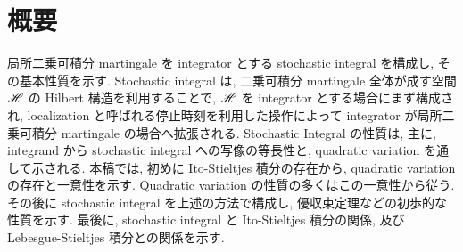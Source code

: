 \documentclass{ltjsarticle}
\begin{document}
\section*{概要}
局所二乗可積分 martingale を integrator とする stochastic integral を構成し, その基本性質を示す.
Stochastic integral は, 二乗可積分 martingale 全体が成す空間 $ \mathscr{H} $ の Hilbert 構造を利用することで, $ \mathscr{H} $ を integrator とする場合にまず構成され,  localization と呼ばれる停止時刻を利用した操作によって integrator が局所二乗可積分 martingale の場合へ拡張される.
Stochastic Integral の性質は, 主に, integrand から stochastic integral への写像の等長性と, quadratic variation を通して示される.
本稿では, 初めに Ito-Stieltjes 積分の存在から, quadratic variation の存在と一意性を示す.
Quadratic variation の性質の多くはこの一意性から従う.
その後に stochastic integral を上述の方法で構成し, 優収束定理などの初歩的な性質を示す. 最後に, stochastic integral と Ito-Stieltjes 積分の関係, 及び Lebesgue-Stieltjes 積分との関係を示す.
\end{document}
